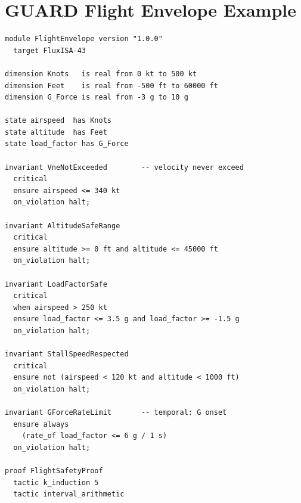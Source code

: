 \documentclass[sigplan,10pt,review]{acmart}
\begin{document}
\section{GUARD Flight Envelope Example}
\label{app:flight}

\begin{lstlisting}[style=guardcode,caption={GUARD flight envelope constraint (excerpt).},label={lst:flight}]
module FlightEnvelope version "1.0.0"
  target FluxISA-43

dimension Knots   is real from 0 kt to 500 kt
dimension Feet    is real from -500 ft to 60000 ft
dimension G_Force is real from -3 g to 10 g

state airspeed  has Knots
state altitude  has Feet
state load_factor has G_Force

invariant VneNotExceeded        -- velocity never exceed
  critical
  ensure airspeed <= 340 kt
  on_violation halt;

invariant AltitudeSafeRange
  critical
  ensure altitude >= 0 ft and altitude <= 45000 ft
  on_violation halt;

invariant LoadFactorSafe
  critical
  when airspeed > 250 kt
  ensure load_factor <= 3.5 g and load_factor >= -1.5 g
  on_violation halt;

invariant StallSpeedRespected
  critical
  ensure not (airspeed < 120 kt and altitude < 1000 ft)
  on_violation halt;

invariant GForceRateLimit       -- temporal: G onset
  ensure always
    (rate_of load_factor <= 6 g / 1 s)
  on_violation halt;

proof FlightSafetyProof
  tactic k_induction 5
  tactic interval_arithmetic
\end{lstlisting}
\end{document}
